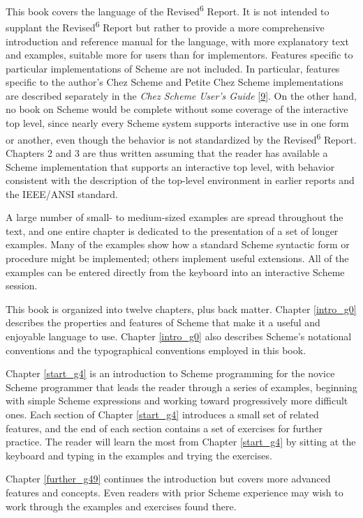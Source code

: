 This book covers the language of the Revised\textsuperscript{6} Report.
It is not intended to supplant the Revised\textsuperscript{6} Report but rather to
provide a more comprehensive introduction and reference
manual for the language, with more explanatory text and examples,
suitable more for users than for implementors.
Features specific to particular implementations of Scheme are not included.
In particular, features specific to the author's
\label{preface_s3}Chez Scheme and
\label{preface_s4}Petite Chez Scheme implementations are described separately
in the \textit{Chez Scheme User's Guide} [\hyperref[bibliography_g227]{9}].
On the other hand, no book on Scheme would be complete without some coverage
of the interactive top level, since nearly every Scheme system supports interactive
use in one form or another, even though the behavior is not standardized by the
Revised\textsuperscript{6} Report.
Chapters 2 and 3 are thus written assuming that the reader has available a Scheme
implementation that supports an interactive top level, with behavior consistent
with the description of the top-level environment in earlier reports and the
IEEE/ANSI standard.


A large number of small- to medium-sized examples are spread throughout
the text, and one entire chapter is dedicated to the presentation of a
set of longer examples.
Many of the examples show how a standard Scheme syntactic form or
procedure might be implemented;
others implement useful extensions.
All of the examples can
be entered directly from the keyboard into an interactive Scheme
session.


This book is organized into twelve chapters, plus back matter.
Chapter \ref{intro_g0} describes the properties and features of
Scheme that make it a useful and enjoyable language to use.
Chapter \ref{intro_g0} also describes Scheme's notational conventions and the
typographical conventions employed in this book.


Chapter \ref{start_g4} is an introduction to Scheme programming
for the novice Scheme
programmer that leads the reader through a series of examples, beginning with
simple Scheme expressions and working toward progressively more
difficult ones.
Each section of Chapter \ref{start_g4} introduces
a small set of related features, and
the end of each section contains a set of exercises for further practice.
The reader will learn the most from Chapter \ref{start_g4} by
sitting at the keyboard
and typing in the examples and trying the exercises.


Chapter \ref{further_g49} continues the introduction but covers
more advanced features and concepts.
Even readers with prior Scheme experience may wish to work
through the examples and exercises found there.


